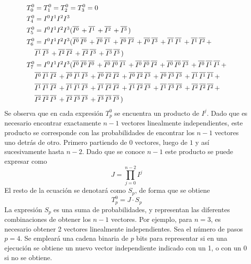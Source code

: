 \begin{equation}
\begin{split}
	T^0_0 &= T^0_1 = T^0_2 = T^0_3 = 0 \\
%
	T^0_4 &= I^0I^1I^2I^3 \\
%
	T^0_5 &= I^0I^1I^2I^3 (\NI 0 + \NI 1 + \NI 2 + \NI 3) \\
%
	T^0_6 &= I^0I^1I^2I^3 (
		\NI 0 \NI 0 +
		\NI 0 \NI 1 +
		\NI 0 \NI 2 +
		\NI 0 \NI 3 +
		\NI 1 \NI 1 +
		\NI 1 \NI 2 +\\
&		\NI	1 \NI 3 +
		\NI 2 \NI 2 +
		\NI 2 \NI 3 +
		\NI 3 \NI 3) \\
%
	T^0_7 &= I^0I^1I^2I^3 (
		\NI 0 \NI 0 \NI 0 +
		\NI 0 \NI 0 \NI 1 +
		\NI 0 \NI 0 \NI 2 +
		\NI 0 \NI 0 \NI 3 +
		\NI 0 \NI 1 \NI 1 +
\\&	\NI 0 \NI 1 \NI 2 +
		\NI 0 \NI 1 \NI 3 +
		\NI 0 \NI 2 \NI 2 +
		\NI 0 \NI 2 \NI 3 +
		\NI 0 \NI 3 \NI 3 +
		\NI 1 \NI 1 \NI 1 +
\\&	\NI 1 \NI 1 \NI 2 +
		\NI 1 \NI 1 \NI 3 +
		\NI 1 \NI 2 \NI 2 +
		\NI 1 \NI 2 \NI 3 +
		\NI 1 \NI 3 \NI 3 +
		\NI 2 \NI 2 \NI 2 +
\\&	\NI 2 \NI 2 \NI 3 +
		\NI 2 \NI 3 \NI 3 +
		\NI 3 \NI 3 \NI 3) \\
\end{split}
\end{equation}
%
Se observa que en cada expresión $T_p^0$ se encuentra un producto de $I^j$. Dado 
que es necesario encontrar exactamente $n-1$ vectores linealmente 
independientes, este producto se corresponde con las probabilidades de encontrar 
los $n-1$ vectores uno detrás de otro. Primero partiendo de $0$ vectores, luego 
de $1$ y así sucesivamente hasta $n-2$. Dado que se conoce $n-1$ este producto 
se puede expresar como
$$
	J =\prod^{n-2}_{j=0} I^j
$$
%
El resto de la ecuación se denotará como $S_p$, de forma que se obtiene
$$
	T^0_p = J \cdot S_p
$$
%
La expresión $S_p$ es una suma de probabilidades, y representan las diferentes 
combinaciones de obtener los $n-1$ vectores. Por ejemplo, para $n=3$, es 
necesario obtener 2 vectores linealmente independientes. Sea el número de pasos 
$p = 4$. Se empleará una cadena binaria de $p$ bits para representar si en una 
ejecución se obtiene un nuevo vector independiente indicado con un 1, o con un 0 
si no se obtiene.

